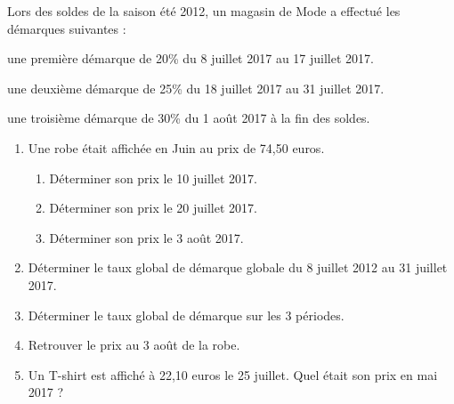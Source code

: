 
 

Lors des soldes de la saison été 2012, un magasin de Mode a effectué les démarques suivantes :
\begin{description} 
\item une première démarque de 20\% du 8 juillet 2017 au 17 juillet 2017.
\item une deuxième démarque de 25\% du 18 juillet 2017 au 31 juillet 2017.
\item une troisième démarque de 30\% du 1 août 2017 à la fin des soldes.
\end{description}

\begin{enumerate}
\item  Une robe était affichée en Juin au prix de 74,50 euros.
\begin{enumerate}
\item  Déterminer son prix le 10 juillet 2017.
\item  Déterminer son prix le 20 juillet 2017.
\item  Déterminer son prix le 3 août 2017.
\end{enumerate}
\item  Déterminer le taux global de démarque globale du 8 juillet 2012 au 31 juillet 2017.
\item  Déterminer le taux global de démarque sur les 3 périodes.
\item  Retrouver le prix au 3 août de la robe.
\item  Un T-shirt est affiché à 22,10 euros le 25 juillet. Quel était son prix en mai 2017 ?
\end{enumerate}

 

